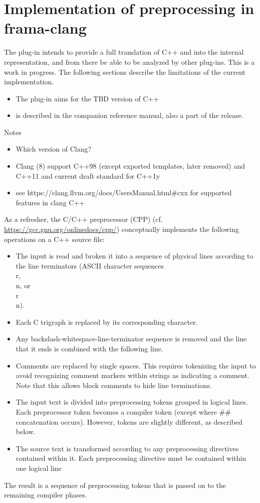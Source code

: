 \section{Implementation of preprocessing in frama-clang}
\label{sec:ppimpl}

The \fclang plug-in intends to provide a full translation of C++ and \NAME{} into the \framac internal representation, and from there be able to be analyzed by other \framac plug-ins. This is a work in progress. The following sections describe the  limitations of the current implementation.
\begin{itemize}
	\item The plug-in aims for the TBD version of C++
	\item \NAME{} is described in the companion \NAME{} reference manual, also a part of the \framac release.
\end{itemize}


Notes
\begin{itemize}
	\item Which version of Clang?
	\item Clang (8) support C++98 (except exported templates, later removed) and C++11 and current draft standard for C++1y 
	\item see https://clang.llvm.org/docs/UsersManual.html\#cxx for supported features in clang C++
\end{itemize}


As a refresher, the C/C++ preprocessor (CPP) (cf. \url{https://gcc.gnu.org/onlinedocs/cpp/}) conceptually implements the following operations on a C++ source file:
\begin{itemize}
	\item The input is read and broken it into a sequence of physical lines according to the line terminators (ASCII character sequences \\r, \\n, or \\r\\n).
	\item Each C trigraph is replaced by its corresponding character.
	\item Any backslash-whitespace-line-terminator sequence is removed and the line that it ends is combined with the following line.
	\item Comments are replaced by single spaces. This requires tokenizing the input to avoid recognizing comment markers within strings as indicating a comment. Note that this allows block comments to hide line terminations.
	\item The input text is divided into preprocessing tokens grouped in logical lines. Each preprocessor token becomes a compiler token (except where \#\# concatenation occurs). However, \acslb tokens are slightly different, as described below.
	\item The source text is transformed according to any preprocessing directives contained within it. Each preprocessing directive must be contained within one logical line
	
\end{itemize}
The result is a sequence of preprocessing tokens that is passed on to the 
remaining compiler phases.

